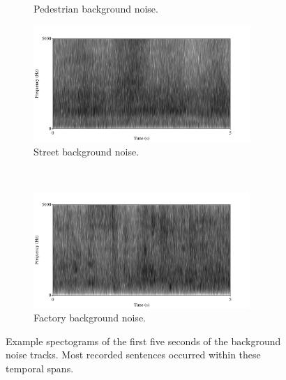 \begin{figure}[h!]
\begin{subfigure}{0.475\linewidth}
  \caption{Pedestrian background noise.}
  \label{fig:ped-bkgrnd}
\end{subfigure}
\qquad
\begin{subfigure}{0.475\linewidth}
  \centering
  \includegraphics[width=0.9\textwidth]{figure/spctgrm-str-background.png}
  \caption{Street background noise.}
  \label{fig:str-bkgrnd}
\end{subfigure}%
\\[2ex]
\begin{center}
\begin{subfigure}{0.475\linewidth}
  \centering
  \includegraphics[width=0.9\textwidth]{figure/spctgrm-fac-background.png}
  \caption{Factory background noise.}
  \label{fig:fac-bkgrnd}
\end{subfigure}
\end{center}
\caption{Example spectograms of the first five seconds of the background noise tracks. Most recorded sentences occurred within these temporal spans.}
\label{fig:bkgrnd-noises}
\end{figure}

